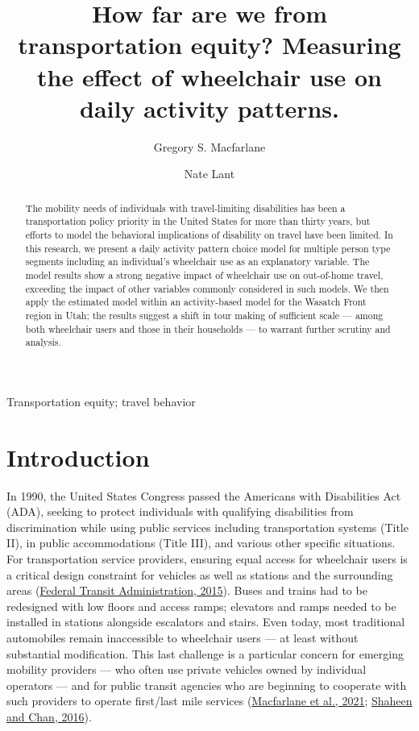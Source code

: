\documentclass[3p, authoryear, review]{elsarticle} %
\begin{document}
\begin{frontmatter}

  \title{How far are we from transportation equity? Measuring the effect of wheelchair use on daily activity patterns.}
    \author[BYU]{Gregory S. Macfarlane}
    \author[BYU]{Nate Lant}
      \address[BYU]{Brigham Young University, Civil and Construction Engineering Department, 430 Engineering Building, Provo, Utah 84602}
  
  \begin{abstract}
  The mobility needs of individuals with travel-limiting disabilities has been a transportation policy priority in the United States for more than thirty years, but efforts to model the behavioral implications of disability on travel have been limited. In this research, we present a daily activity pattern choice model for multiple person type segments including an individual's wheelchair use as an explanatory variable. The model results show a strong negative impact of wheelchair use on out-of-home travel, exceeding the impact of other variables commonly considered in such models. We then apply the estimated model within an activity-based model for the Wasatch Front region in Utah; the results suggest a shift in tour making of sufficient scale --- among both wheelchair users and those in their households --- to warrant further scrutiny and analysis.
  \end{abstract}
   \begin{keyword} Transportation equity; travel behavior\end{keyword}
 \end{frontmatter}

\hypertarget{intro}{%
\section{Introduction}\label{intro}}

In 1990, the United States Congress passed the Americans with Disabilities Act (ADA),
seeking to protect individuals with qualifying disabilities from discrimination
while using public services including transportation systems (Title II), in
public accommodations (Title III), and various other specific situations. For
transportation service providers, ensuring equal access for wheelchair users is
a critical design constraint for vehicles as well as stations and the surrounding areas
(\protect\hyperlink{ref-fhwaada}{Federal Transit Administration, 2015}).
Buses and trains had to be redesigned with low floors and access ramps;
elevators and ramps needed to be installed in stations alongside escalators and
stairs. Even today, most traditional automobiles remain inaccessible to wheelchair users --- at least
without substantial modification. This last challenge is
a particular concern for emerging mobility providers --- who often use
private vehicles owned by individual operators --- and for public transit agencies who
are beginning to cooperate with such providers to operate first/last mile
services (\protect\hyperlink{ref-Macfarlane2021}{Macfarlane et al., 2021}; \protect\hyperlink{ref-Shaheen2016}{Shaheen and Chan, 2016}).
\end{document}
